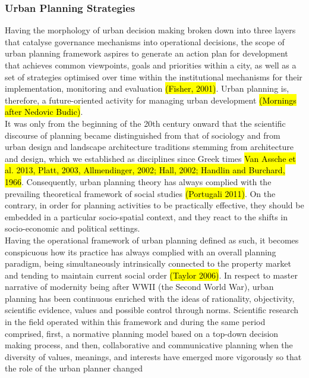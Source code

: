 \documentclass[11pt]{report}
\begin{document}
\subsubsection{Urban Planning Strategies}

Having the morphology of urban decision making broken down into three layers that catalyse governance mechanisms into operational decisions, the scope of urban  planning  framework aspires  to  generate  an  action  plan  for  development  that  achieves  common 
viewpoints,  goals  and  priorities  within  a city,  as  well  as  a  set  of  strategies  optimised  over  time  within  the institutional mechanisms for their implementation, monitoring and evaluation \hl{(Fisher, 2001)}.
Urban planning is, therefore, a future-oriented activity for managing urban development \hl{(Mornings after Nedovic Budic)}. 
\\
It was only from the beginning of the 20th century onward that the scientific discourse of planning became distinguished from that of sociology and from urban design and landscape architecture traditions stemming from architecture and design, which we established as disciplines since Greek times \hl{Van Assche et al. 2013, Platt, 2003, Allmendinger, 2002; Hall, 2002; Handlin and Burchard, 1966}. 
Consequently, urban planning theory has always complied with the prevailing theoretical framework of social studies \hl{(Portugali 
2011)}.
On the contrary, in order for planning activities to be practically effective, they should be embedded in a particular socio-spatial context, and they react to the shifts in socio-economic and political settings.
\\
Having the operational framework of urban planning defined as such, it becomes conspicuous how its practice has always complied with an overall planning paradigm, being simultaneously  intrinsically  connected to the property  market and tending to maintain current social order \hl{(Taylor 2006)}. 
In respect to master narrative of modernity being after WWII (the Second World War), urban planning has been continuous enriched with the ideas of rationality, objectivity, scientific evidence, values and possible control through norms. 
Scientific  research  in  the  field  operated  within  this  framework  and  during  the  same  period  comprised,  first,  a  normative planning model based on a top-down decision making process, and then, collaborative and communicative planning when 
the diversity of values, meanings, and interests have emerged more vigorously so that the role of the urban planner changed 
\end{document}
